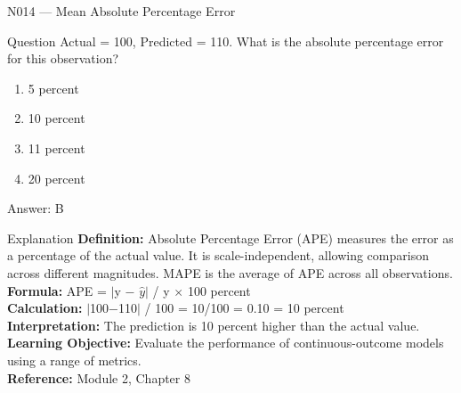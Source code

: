 \documentclass[aspectratio=169,8pt]{beamer}
\begin{document}
	\begin{frame}{N014 --- Mean Absolute Percentage Error}
		\begin{block}{Question}
			Actual = 100, Predicted = 110. What is the absolute percentage error for this observation?
			\begin{enumerate}
				\item 5 percent
				\item 10 percent
				\item 11 percent
				\item 20 percent
			\end{enumerate}
		\end{block}
		\begin{exampleblock}{Answer: B}\end{exampleblock}
		\begin{block}{Explanation}
			\textbf{Definition:} Absolute Percentage Error (APE) measures the error as a percentage of the actual value. It is scale-independent, allowing comparison across different magnitudes. MAPE is the average of APE across all observations.\\
			\textbf{Formula:} APE = $|$y $-$ $\hat{y}$$|$ / y $\times$ 100 percent\\
			\textbf{Calculation:} $|$100$-$110$|$ / 100 = 10/100 = 0.10 = 10 percent\\
			\textbf{Interpretation:} The prediction is 10 percent higher than the actual value.\\
			\textbf{Learning Objective:} Evaluate the performance of continuous-outcome models using a range of metrics.\\
			\textbf{Reference:} Module 2, Chapter 8
		\end{block}
	\end{frame}
	
\end{document}
